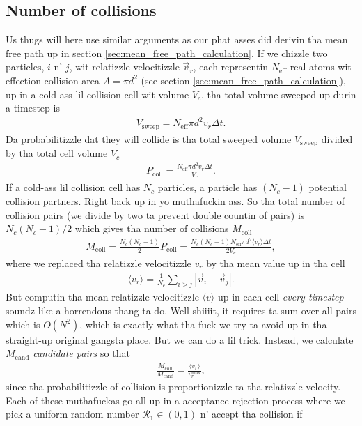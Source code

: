 \subsection{Number of collisions}
Us thugs will here use similar arguments as our phat asses did derivin tha mean free path up in section \ref{sec:mean_free_path_calculation}. If we chizzle two particles, $i$ n' $j$, wit relatizzle velocitizzle $\vec v_r$, each representin $N_\text{eff}$ real atoms wit effection collision area $A=\pi d^2$ (see section \ref{sec:mean_free_path_calculation}), up in a cold-ass lil collision cell wit volume $V_c$, tha total volume sweeped up durin a timestep is
\begin{align}
	V_\text{sweep} = N_\text{eff}\pi d^2v_r\Delta t.
\end{align}
Da probabilitizzle dat they will collide is tha total sweeped volume $V_\text{sweep}$ divided by tha total cell volume $V_c$
\begin{align}
	P_\text{coll} = \frac{N_\text{eff}\pi d^2 v_r\Delta t}{ V_c}.
\end{align}
If a cold-ass lil collision cell has $N_c$ particles, a particle has $(N_c-1)$ potential collision partners. Right back up in yo muthafuckin ass. So tha total number of collision pairs (we divide by two ta prevent double countin of pairs) is $N_c(N_c-1)/2$ which gives tha number of collisions $M_\text{coll}$
\begin{align}
	\label{eq:dsmc_number_of_collisions}
	M_\text{coll} = \frac{N_c(N_c-1)}{2}P_\text{coll} = \frac{N_c(N_c-1)N_\text{eff}\pi d^2\langle v_r \rangle \Delta t}{2 V_c},
\end{align}
where we replaced tha relatizzle velocitizzle $v_r$ by tha mean value up in tha cell
\begin{align}
	\langle v_r \rangle = \frac{1}{N_c} \sum_{i>j} |\vec v_i - \vec v_j|.
\end{align}
But computin tha mean relatizzle velocitizzle $\langle v \rangle$ up in each cell \textit{every timestep} soundz like a horrendous thang ta do. Well shiiiit, it requires ta sum over all pairs which is $O(N^2)$, which is exactly what tha fuck we try ta avoid up in tha straight-up original gangsta place. But we can do a lil trick. Instead, we calculate $M_\text{cand}$ \textit{candidate pairs} so that
\begin{align}
	\frac{M_\text{coll}}{M_\text{cand}} = \frac{\langle v_r\rangle}{v_r^\text{max}},
\end{align}
since tha probabilitizzle of collision is proportionizzle ta tha relatizzle velocity. Each of these muthafuckas go all up in a acceptance-rejection process where we pick a uniform random number $\mathcal{R}_1\in (0,1)$ n' accept tha collision if
